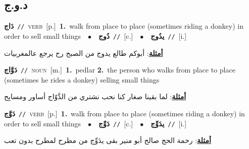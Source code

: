 \documentclass[10pt,a4paper,twoside]{article} %
\begin{document}
\begin{multicols}{2}
\vspace{-3mm}
\subsection*{\color{blue}\foreignlanguage{arabic}{د.و.ج}\color{blue}{}} 

{\setlength\topsep{0pt}\textbf{\foreignlanguage{arabic}{دَاج}}\ {\color{gray}\texttt{//}\color{black}}\ \textsc{verb}\ [p.]\ \textbf{1.}~walk from place to place (sometimes riding a donkey) in order to sell small things\ \ $\bullet$\ \ \setlength\topsep{0pt}\textbf{\foreignlanguage{arabic}{دُوج}}\ {\color{gray}\texttt{//}\color{black}}\ [c.]\ \ $\bullet$\ \ \setlength\topsep{0pt}\textbf{\foreignlanguage{arabic}{يدُوج}}\ {\color{gray}\texttt{//}\color{black}}\ [i.]\  \begin{flushright}\color{gray}\foreignlanguage{arabic}{\textbf{\underline{\foreignlanguage{arabic}{أمثلة}}}: أبوكم طالع يدوج من الصبح رح يرجع عالمغربيات}\end{flushright}\color{black}} \vspace{2mm}

{\setlength\topsep{0pt}\textbf{\foreignlanguage{arabic}{دَوَّاج}}\ {\color{gray}\texttt{//}\color{black}}\ \textsc{noun}\ [m.]\ \textbf{1.}~pedlar  \textbf{2.}~the person who walks from place to place (sometimes he rides a donkey) selling small things\  \begin{flushright}\color{gray}\foreignlanguage{arabic}{\textbf{\underline{\foreignlanguage{arabic}{أمثلة}}}: لما بقينا صغار كنا نحب نشتري من الدَّوّاج أساور ومسابِح}\end{flushright}\color{black}} \vspace{2mm}

{\setlength\topsep{0pt}\textbf{\foreignlanguage{arabic}{دَوَّج}}\ {\color{gray}\texttt{//}\color{black}}\ \textsc{verb}\ [p.]\ \textbf{1.}~walk from place to place (sometimes riding a donkey) in order to sell small things\ \ $\bullet$\ \ \setlength\topsep{0pt}\textbf{\foreignlanguage{arabic}{دَوِّج}}\ {\color{gray}\texttt{//}\color{black}}\ [c.]\ \ $\bullet$\ \ \setlength\topsep{0pt}\textbf{\foreignlanguage{arabic}{يدَوِّج}}\ {\color{gray}\texttt{//}\color{black}}\ [i.]\  \begin{flushright}\color{gray}\foreignlanguage{arabic}{\textbf{\underline{\foreignlanguage{arabic}{أمثلة}}}: رحمة الحج صالح أبو منير بقى يدَوِّج من مطرح لمطرح بدون تعب}\end{flushright}\color{black}} \vspace{2mm}


\end{multicols}
\end{document}
